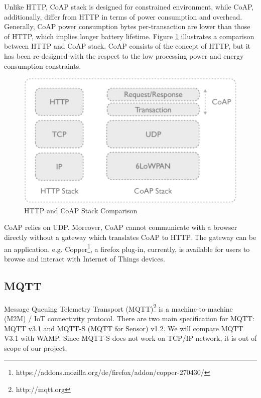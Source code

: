 Unlike HTTP, CoAP stack is designed for constrained environment, while CoAP, additionally, differ from HTTP in terms of power consumption and overhead. Generally, CoAP power consumption bytes per-transaction are lower than those of HTTP, which implies longer battery lifetime. Figure \ref{fig:http-and-coap-stack} illustrates a comparison between HTTP and CoAP stack. CoAP consists of the concept of HTTP, but it has been re-designed with the respect to the low processing power and energy consumption constraints. \cite{colitti2011integrating}

\begin{figure}[ht]
  \begin{center}
    \includegraphics[width=1\textwidth]{images/http-and-coap-stack.pdf}
    \caption{HTTP and CoAP Stack Comparison}
    \label{fig:http-and-coap-stack}
  \end{center}
\end{figure}

CoAP relies on UDP. Moreover, CoAP cannot communicate with a browser directly without a gateway which translates CoAP to HTTP. The gateway can be an application. e.g. Copper\footnote{https://addons.mozilla.org/de/firefox/addon/copper-270430/}, a firefox plug-in, currently, is available for users to browse and interact with Internet of Things devices.

\subsection{MQTT}
Message Queuing Telemetry Transport (MQTT)\footnote{http://mqtt.org} is a machine-to-machine (M2M) / IoT connectivity protocol. There are two main specification for MQTT: MQTT v3.1 and MQTT-S (MQTT for Sensor) v1.2. We will compare MQTT V3.1 with WAMP. Since MQTT-S does not work on TCP/IP network, it is out of scope of our project.

